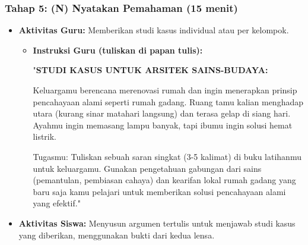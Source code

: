 \documentclass[12pt,a4paper]{article}
\begin{document}
\subsubsection{Tahap 5: (N) Nyatakan Pemahaman (15 menit)}
\begin{itemize}
\item \textbf{Aktivitas Guru:} Memberikan studi kasus individual atau per kelompok.
    \begin{itemize}
    \item \textbf{Instruksi Guru (tuliskan di papan tulis):}
    
    "\textbf{STUDI KASUS UNTUK ARSITEK SAINS-BUDAYA:}
    
    Keluargamu berencana merenovasi rumah dan ingin menerapkan prinsip pencahayaan alami seperti rumah gadang. Ruang tamu kalian menghadap utara (kurang sinar matahari langsung) dan terasa gelap di siang hari. Ayahmu ingin memasang lampu banyak, tapi ibumu ingin solusi hemat listrik.
    
    Tugasmu: Tuliskan sebuah saran singkat (3-5 kalimat) di buku latihanmu untuk keluargamu. Gunakan pengetahuan gabungan dari sains (pemantulan, pembiasan cahaya) dan kearifan lokal rumah gadang yang baru saja kamu pelajari untuk memberikan solusi pencahayaan alami yang efektif."
    \end{itemize}
\item \textbf{Aktivitas Siswa:} Menyusun argumen tertulis untuk menjawab studi kasus yang diberikan, menggunakan bukti dari kedua lensa.
\end{itemize}
\end{document}
